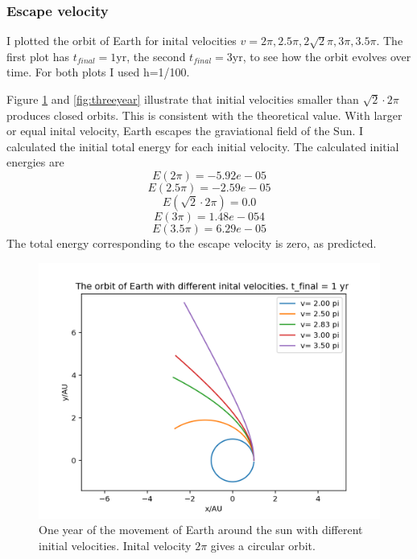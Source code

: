 \documentclass{article}
\begin{document}
\subsubsection{Escape velocity}
I plotted the orbit of Earth for inital velocities $v=2\pi, 2.5\pi, 2 \sqrt{2}\pi, 3\pi, 3.5\pi$. The first plot has $t_{final} = 1\textrm{yr}$, the second  $t_{final} = 3\textrm{yr}$, to see how the orbit evolves over time. For both plots I used h=1/100. 

Figure \ref{fig:oneyear} and \ref{fig:threeyear}  illustrate that initial velocities smaller than  $\sqrt{2}\cdot2\pi$ produces closed orbits. This is consistent with the theoretical value. With larger or equal inital velocity, Earth escapes the graviational field of the Sun. I calculated the initial total energy for each initial velocity. The calculated initial energies are 
$$E(2\pi)=-5.92e-05$$
$$E(2.5\pi)=-2.59e-05$$
$$E(\sqrt{2}\cdot2\pi) = 0.0$$
$$E(3 \pi) = 1.48e-054$$
$$E(3.5\pi)= 6.29e-05$$
The total energy corresponding to the escape velocity is zero, as predicted.  
\begin{figure}
  \includegraphics[width=\linewidth]{oneyear.png}
  \caption{One year of the movement of Earth around the sun with different initial velocities. Inital velocity $2\pi$ gives a circular orbit.}
  \label{fig:oneyear}
\end{figure}
\end{document}
